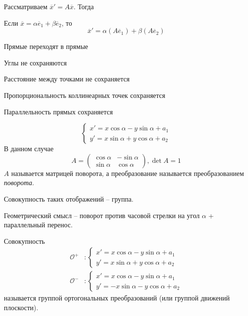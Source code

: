 \begin{Thm}
	Рассматриваем $\overline{x}' = A \overline{x}$. Тогда 
	\begin{MyItemize}
		\item Если $\overline{x} = \alpha \overline{e}_1 + \beta \overline{e}_2$, то
		\[\overline{x}' = \alpha (A \overline{e}_1) + \beta (A \overline{e}_2)\]
		\item Прямые переходят в прямые
		\item Углы не сохраняются
		\item Расстояние между точками не сохраняется
		\item Пропорциональность коллинеарных точек сохраняется
		\item Параллельность прямых сохраняется
	\end{MyItemize}
\end{Thm}


\begin{Def}
	\[\begin{cases}
		x' = x \cos \alpha - y \sin \alpha + a_1 \\
		y' = x \sin \alpha + y \cos \alpha + a_2
	\end{cases}\]
	В данном случае
	\[A = \left(\begin{array}{cc}
	\cos \alpha & -\sin \alpha \\ 
	\sin \alpha & \cos \alpha
	\end{array}\right), \det A = 1\]
	$A$ называется матрицей поворота, а преобразование называется преобразованием \textit{поворота}.  
\end{Def}

\begin{Rem}
	Совокупность таких отображений -- группа.
\end{Rem}

\begin{Rem}
	Геометрический смысл -- поворот против часовой стрелки на угол $\alpha$ + параллельный перенос. 
\end{Rem}

\begin{Def}
	Совокупность
	\begin{align*}
		\mathcal{O^+} &: \begin{cases}
			x' = x \cos \alpha - y \sin \alpha + a_1 \\
			y' = x \sin \alpha + y \cos \alpha + a_2
		\end{cases} \\
		\mathcal{O^-} &: \begin{cases}
			x' = x \cos \alpha - y \sin \alpha + a_1 \\
			y' = -x \sin \alpha - y \cos \alpha + a_2
		\end{cases}
	\end{align*}
	называется группой ортогональных преобразований (или группой движений плоскости).
\end{Def}

